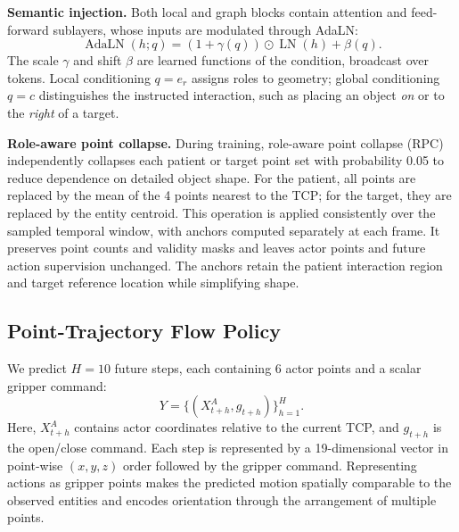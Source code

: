\textbf{Semantic injection.}
Both local and graph blocks contain attention and feed-forward sublayers, whose inputs are modulated through AdaLN:
\begin{equation}
    \operatorname{AdaLN}(h;q)
    =(1+\gamma(q))\odot\operatorname{LN}(h)+\beta(q).
\label{eq:adaln}
\end{equation}
The scale $\gamma$ and shift $\beta$ are learned functions of the condition, broadcast over tokens.
Local conditioning $q=e_r$ assigns roles to geometry; global conditioning $q=c$ distinguishes the instructed interaction, such as placing an object \emph{on} or to the \emph{right} of a target.

\textbf{Role-aware point collapse.}
During training, role-aware point collapse (RPC) independently collapses each patient or target point set with probability 0.05 to reduce dependence on detailed object shape.
For the patient, all points are replaced by the mean of the 4 points nearest to the TCP; for the target, they are replaced by the entity centroid.
This operation is applied consistently over the sampled temporal window, with anchors computed separately at each frame.
It preserves point counts and validity masks and leaves actor points and future action supervision unchanged.
The anchors retain the patient interaction region and target reference location while simplifying shape.

\subsection{Point-Trajectory Flow Policy}
We predict $H=10$ future steps, each containing 6 actor points and a scalar gripper command:
\begin{equation}
    Y=\{(X^A_{t+h},g_{t+h})\}_{h=1}^{H}.
\label{eq:point_trajectory}
\end{equation}
Here, $X^A_{t+h}$ contains actor coordinates relative to the current TCP, and $g_{t+h}$ is the open/close command.
Each step is represented by a 19-dimensional vector in point-wise $(x,y,z)$ order followed by the gripper command.
Representing actions as gripper points makes the predicted motion spatially comparable to the observed entities and encodes orientation through the arrangement of multiple points.

